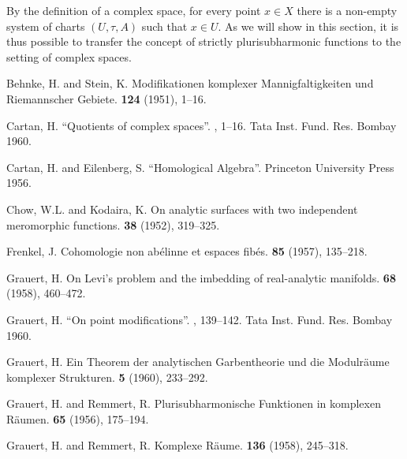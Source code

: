 \documentclass{article}
\theoremstyle{plain}
\theoremstyle{definition}
\begin{document}
By the definition of a complex space, for every point $x\in X$ there is a non-empty system of charts $(U,\tau,A)$ such that $x\in U$.
As we will show in this section, it is thus possible to transfer the concept of strictly plurisubharmonic functions to the setting of complex spaces.



\nocite{*}

\begin{thebibliography}{20}

  {\sc Behnke, H. and Stein, K.}
  \newblock Modifikationen komplexer Mannigfaltigkeiten und Riemannscher Gebiete.
   {\bf 124} (1951), 1--16.

  {\sc Cartan, H.}
  \newblock ``Quotients of complex spaces''.
  , 1--16.
  \newblock Tata Inst. Fund. Res. Bombay 1960.

  {\sc Cartan, H. and Eilenberg, S.}
  \newblock ``Homological Algebra''.
  \newblock Princeton University Press 1956.

  {\sc Chow, W.L. and Kodaira, K.}
  \newblock On analytic surfaces with two independent meromorphic functions.
   {\bf 38} (1952), 319--325.

  {\sc Frenkel, J.}
  \newblock Cohomologie non ab\'{e}linne et espaces fib\'{e}s.
   {\bf 85} (1957), 135--218.

  {\sc Grauert, H.}
  \newblock On Levi's problem and the imbedding of real-analytic manifolds.
   {\bf 68} (1958), 460--472.

  {\sc Grauert, H.}
  \newblock ``On point modifications''.
  , 139--142.
  \newblock Tata Inst. Fund. Res. Bombay 1960.

  {\sc Grauert, H.}
  \newblock Ein Theorem der analytischen Garbentheorie und die Modulr\"{a}ume komplexer Strukturen.
   {\bf 5} (1960), 233--292.

  {\sc Grauert, H. and Remmert, R.}
  \newblock Plurisubharmonische Funktionen in komplexen R\"{a}umen.
   {\bf 65} (1956), 175--194.

  {\sc Grauert, H. and Remmert, R.}
  \newblock Komplexe R\"{a}ume.
   {\bf 136} (1958), 245--318.


\end{thebibliography}
\end{document}
